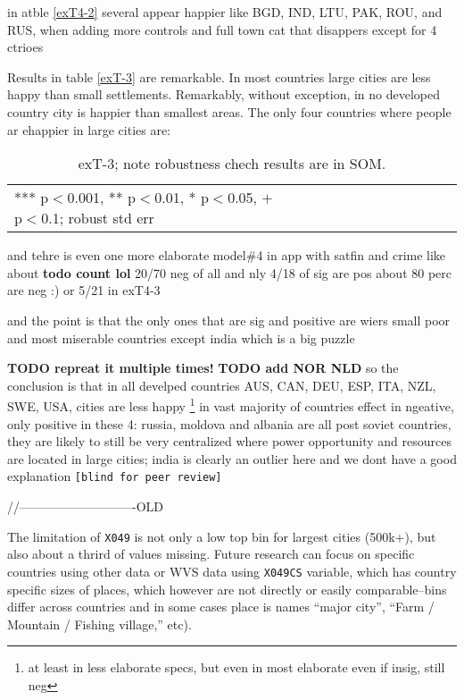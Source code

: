 \documentclass[10pt, letterpaper]{article}
\begin{document}
\begin{spacing}{1.4}
in atble \ref{exT4-2} several appear happier like BGD, IND, LTU, PAK, ROU, and
RUS, when adding more controls and full town cat that disappers except for 4 ctrioes


Results in table \ref{exT-3} are remarkable. In most countries large cities are less
happy than small settlements. Remarkably, without exception, in no developed
country city is happier than smallest areas. The only four countries where
people ar ehappier in large cities are: 

\begin{spacing}{.9}
  \begin{table}[H]\centering \caption{.} \label{d1} \begin{scriptsize} \begin{tabular}{p{1.8in}p{.5in}p{.5in}p{.5in}p{.5in}p{.5in}p{.5in}p{.5in}p{.5in}p{.5in}p{.5
            in}p{.5in}p{.5 in}}\hline
        
\hline  *** p$<$0.001, ** p$<$0.01, * p$<$0.05, $+$ p$<$0.1; robust std err
         \end{tabular}\end{scriptsize}\caption{exT-3; note robustness chech
         results are in SOM.}\end{table}
\end{spacing}
and tehre is even one more elaborate model\#4 in app with satfin and crime
like about \textbf{todo count lol} 20/70 neg of all and nly 4/18 of sig are pos
about 80 perc are neg :) or 5/21 in exT4-3

and the point is that the only ones that are sig and positive are wiers small
poor and most miserable countries except india which is a big puzzle

\textbf{TODO repreat it multiple times!} \textbf{TODO add NOR NLD}
so the conclusion is that in all develped countries AUS, CAN, DEU, ESP, ITA,
NZL, SWE, USA,  cities are less happy \footnote{at least in less elaborate
  specs, but even in most elaborate even if insig, still neg} in vast majority
of countries effect in ngeative, only positive in these 4:
russia, moldova and albania are all post soviet countries, they are likely to
still be very centralized where  power opportunity and resources are located in
large cities; india is clearly an outlier here and we dont have a good
explanation \texttt{[blind for peer review]} %



//----------------------------OLD




The limitation of \texttt{X049} is not only a low top bin for largest cities
(500k+), but also about a thrird of values missing. Future research can focus on
specific countries using other data or WVS data using \texttt{X049CS} variable,
which has country specific sizes of places, which however are not directly or
easily comparable--bins differ across countries and in some cases place is names
``major city'', ``Farm / Mountain / Fishing village,'' etc). 


\end{spacing}
\end{document}
